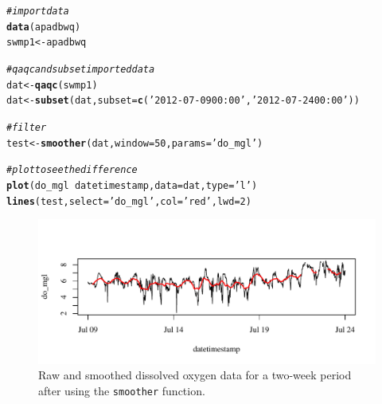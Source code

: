 \documentclass[10pt,letterpaper]{article}\usepackage[]{graphicx}\usepackage[]{color}
\makeatletter
\def\maxwidth{ %
  \ifdim\Gin@nat@width>\linewidth
    \linewidth
  \else
    \Gin@nat@width
  \fi
}
\newcommand{\hlnum}[1]{\textcolor[rgb]{0.686,0.059,0.569}{#1}}%
\newcommand{\hlstr}[1]{\textcolor[rgb]{0.192,0.494,0.8}{#1}}%
\newcommand{\hlcom}[1]{\textcolor[rgb]{0.678,0.584,0.686}{\textit{#1}}}%
\newcommand{\hlopt}[1]{\textcolor[rgb]{0,0,0}{#1}}%
\newcommand{\hlstd}[1]{\textcolor[rgb]{0.345,0.345,0.345}{#1}}%
\newcommand{\hlkwb}[1]{\textcolor[rgb]{0.69,0.353,0.396}{#1}}%
\newcommand{\hlkwc}[1]{\textcolor[rgb]{0.333,0.667,0.333}{#1}}%
\newcommand{\hlkwd}[1]{\textcolor[rgb]{0.737,0.353,0.396}{\textbf{#1}}}%
\newenvironment{kframe}{%
 \def\at@end@of@kframe{}%
 \ifinner\ifhmode%
  \def\at@end@of@kframe{\end{minipage}}%
  \begin{minipage}{\columnwidth}%
 \fi\fi%
 \def\FrameCommand##1{\hskip\@totalleftmargin \hskip-\fboxsep
 \colorbox{shadecolor}{##1}\hskip-\fboxsep
     \hskip-\linewidth \hskip-\@totalleftmargin \hskip\columnwidth}%
 \MakeFramed {\advance\hsize-\width
   \@totalleftmargin\z@ \linewidth\hsize
   \@setminipage}}%
 {\par\unskip\endMakeFramed%
 \at@end@of@kframe}
\newenvironment{knitrout}{}{} %
\makeatother
\begin{document}
\begin{knitrout}
\color{fgcolor}\begin{kframe}
\begin{alltt}
\hlcom{# import data}
\hlkwd{data}\hlstd{(apadbwq)}
\hlstd{swmp1} \hlkwb{<-} \hlstd{apadbwq}

\hlcom{# qaqc and subset imported data}
\hlstd{dat} \hlkwb{<-} \hlkwd{qaqc}\hlstd{(swmp1)}
\hlstd{dat} \hlkwb{<-} \hlkwd{subset}\hlstd{(dat,} \hlkwc{subset} \hlstd{=} \hlkwd{c}\hlstd{(}\hlstr{'2012-07-09 00:00'}\hlstd{,} \hlstr{'2012-07-24 00:00'}\hlstd{))}

\hlcom{# filter}
\hlstd{test} \hlkwb{<-} \hlkwd{smoother}\hlstd{(dat,} \hlkwc{window} \hlstd{=} \hlnum{50}\hlstd{,} \hlkwc{params} \hlstd{=} \hlstr{'do_mgl'}\hlstd{)}

\hlcom{# plot to see the difference}
\hlkwd{plot}\hlstd{(do_mgl} \hlopt{~} \hlstd{datetimestamp,} \hlkwc{data} \hlstd{= dat,} \hlkwc{type} \hlstd{=} \hlstr{'l'}\hlstd{)}
\hlkwd{lines}\hlstd{(test,} \hlkwc{select} \hlstd{=} \hlstr{'do_mgl'}\hlstd{,} \hlkwc{col} \hlstd{=} \hlstr{'red'}\hlstd{,} \hlkwc{lwd} \hlstd{=} \hlnum{2}\hlstd{)}
\end{alltt}
\end{kframe}\begin{figure}[!ht]


{\centering \includegraphics[width=\maxwidth]{figure/smooth_ex} 

}

\caption[Raw and smoothed dissolved oxygen data for a two-week period after using the \texttt{smoother} function]{Raw and smoothed dissolved oxygen data for a two-week period after using the \texttt{smoother} function.\label{fig:smooth_ex}}
\end{figure}


\end{knitrout}
\end{document}
